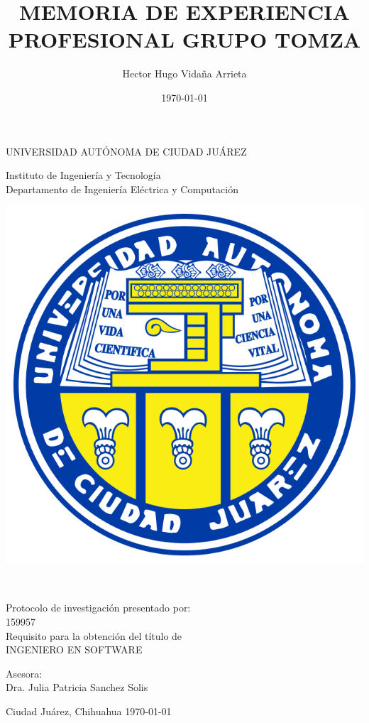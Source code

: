 \documentclass[final, fmstyle, 12pt]{article}
\title{MEMORIA DE EXPERIENCIA PROFESIONAL GRUPO TOMZA}
\author{Hector Hugo Vidaña Arrieta}
\date{\today}
\begin{document}
\renewcommand{\tablename}{Tabla}
	\thispagestyle{empty}
\begin{center} \vfill
{\Large UNIVERSIDAD AUTÓNOMA DE CIUDAD JUÁREZ}\\
\vspace{6mm}
{\large Instituto de Ingeniería y Tecnología\\
\vspace{6mm}
Departamento de Ingeniería Eléctrica y Computación
\vspace{20mm}

\includegraphics [scale=0.7]{imagenes/escudo-uacj} 
\vspace{10mm}


\thetitle\\
\vspace{15mm}

Protocolo de investigación presentado por:\\
\vspace{6mm}
\theauthor\hspace{10mm} 159957\\
\vspace{10mm}
Requisito para la obtención del título de\\
\vspace{6mm}
INGENIERO EN SOFTWARE\\
\vspace{10mm}

Asesora:\\
{Dra. Julia Patricia Sanchez Solis}\\
} \vfill
	Ciudad Juárez, Chihuahua \hspace{70mm}\today

\clearpage

\end{center}
\end{document}
